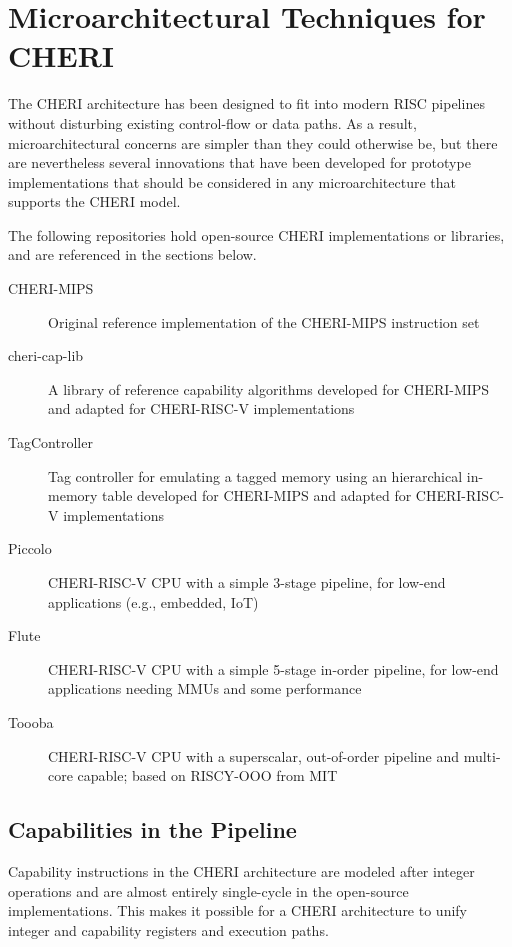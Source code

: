 \chapter{Microarchitectural Techniques for CHERI}
\label{chap:microarchitecture}

The CHERI architecture has been designed to fit into modern RISC pipelines without disturbing existing control-flow or data paths.
As a result, microarchitectural concerns are simpler than they could otherwise be, but there are nevertheless several innovations that have been developed for prototype implementations that should be considered in any microarchitecture that supports the CHERI model.

The following repositories hold open-source CHERI implementations or libraries, and are referenced in the sections below.
\begin{description}
    \item[CHERI-MIPS~\cite{CHERI-cheri-cpu}] Original reference implementation of the CHERI-MIPS instruction set
    \item[cheri-cap-lib~\cite{CHERI-cheri-cap-lib}] A library of reference capability algorithms developed for CHERI-MIPS and adapted for CHERI-RISC-V implementations
    \item[TagController~\cite{CHERI-TagController}] Tag controller for emulating a tagged memory using an hierarchical in-memory table developed for CHERI-MIPS and adapted for CHERI-RISC-V implementations
    \item[Piccolo~\cite{CHERI-Piccolo}] CHERI-RISC-V CPU with a simple 3-stage pipeline, for low-end applications (e.g., embedded, IoT)
    \item[Flute~\cite{CHERI-Flute}] CHERI-RISC-V CPU with a simple 5-stage in-order pipeline, for low-end applications needing MMUs and some performance
    \item[Toooba~\cite{CHERI-Toooba}] CHERI-RISC-V CPU with a superscalar, out-of-order pipeline and multi-core capable; based on RISCY-OOO from MIT
\end{description}

\section{Capabilities in the Pipeline}
Capability instructions in the CHERI architecture are modeled after integer operations and are almost entirely single-cycle in the open-source implementations.
This makes it possible for a CHERI architecture to unify integer and capability registers and execution paths.

